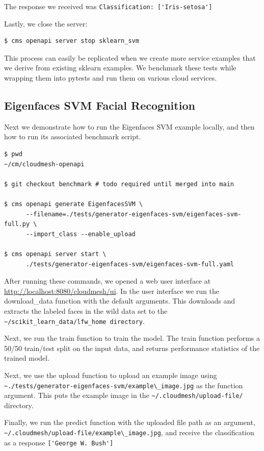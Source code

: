 The response we received was
\verb|Classification: ['Iris-setosa']|

Lastly, we close the server:

\begin{verbatim}
$ cms openapi server stop sklearn_svm
\end{verbatim}

This process can easily be replicated when we create more service
examples that we derive from existing sklearn examples. We benchmark
these tests while wrapping them into pytests and run them on various
cloud services.

\subsection{Eigenfaces SVM Facial
Recognition}\label{a.3.-eigenfaces-svm-facial-recognition}

Next we demonstrate how to run the Eigenfaces SVM example locally, and
then how to run its associated benchmark script.

\begin{verbatim}
$ pwd
~/cm/cloudmesh-openapi

$ git checkout benchmark # todo required until merged into main

$ cms openapi generate EigenfacesSVM \
      --filename=./tests/generator-eigenfaces-svm/eigenfaces-svm-full.py \
      --import_class --enable_upload

$ cms openapi server start \
      ./tests/generator-eigenfaces-svm/eigenfaces-svm-full.yaml
\end{verbatim}

After running these commands, we opened a web user interface at
\url{http://localhost:8080/cloudmesh/ui}. In the user interface we run
the download\_data function with the default arguments. This downloads
and extracts the labeled faces in the wild data set to the
\verb|~/scikit_learn_data/lfw_home directory|.

Next, we run the train function to train the model. The train function
performs a 50/50 train/test split on the input data, and returns
performance statistics of the trained model.

Next, we use the upload function to upload an example image using
\verb|~./tests/generator-eigenfaces-svm/example\_image.jpg|
as the function argument. This puts the example image in the
\verb|~/.cloudmesh/upload-file/| directory.

Finally, we run the predict function with the uploaded file path as an
argument,
\verb|~/.cloudmesh/upload-file/example\_image.jpg|,
and receive the classification as a response
\verb|['George W. Bush']|

